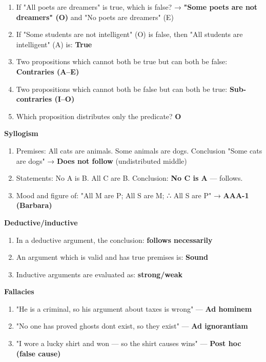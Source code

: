 \begin{enumerate}
\def\labelenumi{\arabic{enumi}.}
\tightlist
\item
  If "All poets are dreamers" is true, which is false? → \textbf{"Some poets are not dreamers" (O)} and "No poets are dreamers" (E)
\item
  If "Some students are not intelligent" (O) is false, then "All students are intelligent" (A) is: \textbf{True}
\item
  Two propositions which cannot both be true but can both be false: \textbf{Contraries (A--E)}
\item
  Two propositions which cannot both be false but can both be true: \textbf{Sub-contraries (I--O)}
\item
  Which proposition distributes only the predicate? \textbf{O}
\end{enumerate}

\textbf{Syllogism}

\begin{enumerate}
\def\labelenumi{\arabic{enumi}.}
\setcounter{enumi}{5}
\tightlist
\item
  Premises: All cats are animals. Some animals are dogs. Conclusion "Some cats are dogs" → \textbf{Does not follow} (undistributed middle)
\item
  Statements: No A is B. All C are B. Conclusion: \textbf{No C is A} --- follows.
\item
  Mood and figure of: "All M are P; All S are M; ∴ All S are P" → \textbf{AAA-1 (Barbara)}
\end{enumerate}

\textbf{Deductive/inductive}

\begin{enumerate}
\def\labelenumi{\arabic{enumi}.}
\setcounter{enumi}{8}
\tightlist
\item
  In a deductive argument, the conclusion: \textbf{follows necessarily}
\item
  An argument which is valid and has true premises is: \textbf{Sound}
\item
  Inductive arguments are evaluated as: \textbf{strong/weak}
\end{enumerate}

\textbf{Fallacies}

\begin{enumerate}
\def\labelenumi{\arabic{enumi}.}
\setcounter{enumi}{11}
\tightlist
\item
  "He is a criminal, so his argument about taxes is wrong" --- \textbf{Ad hominem}
\item
  "No one has proved ghosts don\textquotesingle t exist, so they exist" --- \textbf{Ad ignorantiam}
\item
  "I wore a lucky shirt and won --- so the shirt causes wins" --- \textbf{Post hoc (false cause)}
\end{enumerate}

